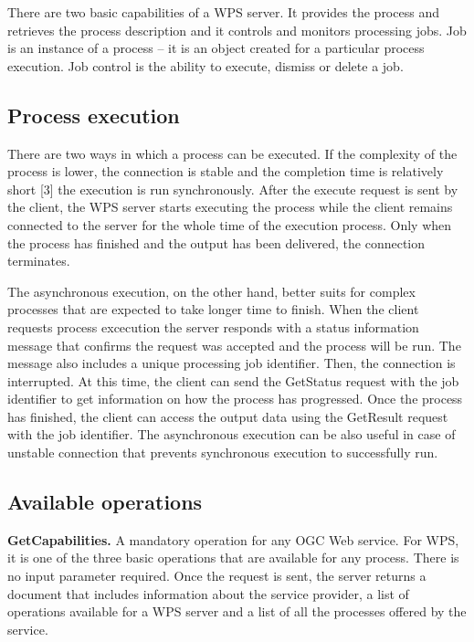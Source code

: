 

There are two basic capabilities of a WPS server. It provides the process and retrieves the process description and it controls and monitors processing jobs. Job is an instance of a process – it is an object created for a particular process execution. Job control is the ability to execute, dismiss or delete a job.

\subsection{Process execution}


There are two ways in which a process can be executed. If the complexity of the process is lower, the connection is stable and the completion time is relatively short [3] the execution is run synchronously. After the execute request is sent by the client, the WPS server starts executing the process while the client remains connected to the server for the whole time of the execution process. Only when the process has finished and the output has been delivered, the connection terminates.\par
The asynchronous execution, on the other hand, better suits for complex processes that are expected to take longer time to finish. When the client requests process excecution the server responds with a status information message that confirms the request was accepted and the process will be run. The message also includes a unique processing job identifier. Then, the connection is interrupted. At this time, the client can send the GetStatus request with the job identifier to get information on how the process has progressed. Once the process has finished, the client can access the output data using the GetResult request with the job identifier. The asynchronous execution can be also useful in case of unstable connection that prevents synchronous execution to successfully run.

\subsection{Available operations}

\textbf{GetCapabilities.} A mandatory operation for any OGC Web service. For WPS, it is one of the three basic operations that are available for any process. There is no input parameter required. Once the request is sent, the server returns a document that includes information about the service provider, a list of operations available for a WPS server and a list of all the processes offered by the service.

